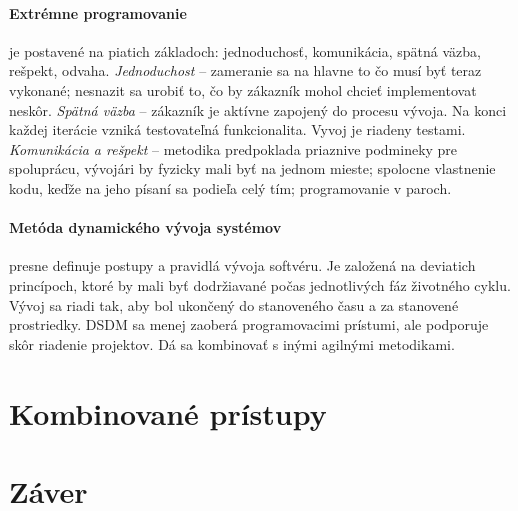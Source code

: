 \documentclass[10pt,twoside,slovak,a4paper,oneside]{article}
\begin{document}
\paragraph{Extrémne programovanie}je postavené na piatich základoch: jednoduchosť, komunikácia, spätná väzba, rešpekt, odvaha.
\emph{Jednoduchost} – zameranie sa na hlavne to čo musí byť teraz vykonané; nesnazit sa urobiť to, čo by zákazník mohol chcieť implementovat neskôr.
\emph{Spätná väzba} – zákazník je aktívne zapojený do procesu vývoja. Na konci každej iterácie vzniká testovateľná funkcionalita. Vyvoj je riadeny testami. 
\emph{Komunikácia a rešpekt} – metodika predpoklada priaznive podmineky pre spoluprácu, vývojári by fyzicky mali byť na jednom mieste; spolocne vlastnenie kodu, keďže na jeho písaní sa podieľa celý tím; programovanie v paroch.
\paragraph{Metóda dynamického vývoja systémov}presne definuje postupy a pravidlá vývoja softvéru. Je založená na deviatich princípoch, ktoré by mali byť dodržiavané počas jednotlivých fáz životného cyklu. Vývoj sa riadi tak, aby bol ukončený do stanoveného času a za stanovené prostriedky. DSDM sa menej zaoberá programovacimi prístumi, ale podporuje skôr riadenie projektov. Dá sa kombinovať s inými agilnými metodikami.

\section{Kombinované prístupy}


\section{Záver}



\end{document}
